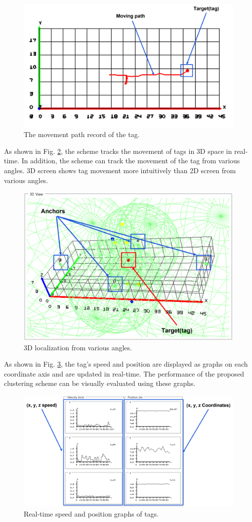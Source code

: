 \documentclass[conference]{IEEEtran}
\begin{document}
\begin{figure}[htbp]
    \centerline{\includegraphics[width=0.62\columnwidth]{fig7.png}}
    \caption{The movement path record of the tag.}
    \label{fig7}
\end{figure}

As shown in Fig. \ref{fig8}, the scheme tracks the movement of tags in 3D space in real-time. In addition, the scheme can track the movement of the tag from various angles. 3D screen shows tag movement more intuitively than 2D screen from various angles.

\begin{figure}[htbp]
    \centerline{\includegraphics[width=0.62\columnwidth]{fig8.png}}
    \caption{3D localization from various angles.}
    \label{fig8}
\end{figure}

As shown in Fig. \ref{fig9}, the tag's speed and position are displayed as graphs on each coordinate axis and are updated in real-time. The performance of the proposed clustering scheme can be visually evaluated using these graphs.

\begin{figure}[htbp]
    \centerline{\includegraphics[width=0.62\columnwidth]{fig9.png}}
    \caption{Real-time speed and position graphs of tags.}
    \label{fig9}
\end{figure}
\end{document}
